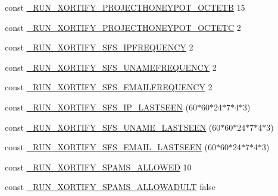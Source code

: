 \begin{DoxyCompactItemize}
\item 
const \hyperlink{config_8php_aa52fc59b0aa945d92da63d4095a6ef4c}{\-\_\-\-R\-U\-N\-\_\-\-X\-O\-R\-T\-I\-F\-Y\-\_\-\-P\-R\-O\-J\-E\-C\-T\-H\-O\-N\-E\-Y\-P\-O\-T\-\_\-\-O\-C\-T\-E\-T\-B} 15
\item 
const \hyperlink{config_8php_aef0ff869d4917b07eeef78e3907051fb}{\-\_\-\-R\-U\-N\-\_\-\-X\-O\-R\-T\-I\-F\-Y\-\_\-\-P\-R\-O\-J\-E\-C\-T\-H\-O\-N\-E\-Y\-P\-O\-T\-\_\-\-O\-C\-T\-E\-T\-C} 2
\item 
const \hyperlink{config_8php_aa1de68f879c9e10c9b2ba56242e0d4ad}{\-\_\-\-R\-U\-N\-\_\-\-X\-O\-R\-T\-I\-F\-Y\-\_\-\-S\-F\-S\-\_\-\-I\-P\-F\-R\-E\-Q\-U\-E\-N\-C\-Y} 2
\item 
const \hyperlink{config_8php_a5fa0c103131b6fb71c3aee12b5f3988f}{\-\_\-\-R\-U\-N\-\_\-\-X\-O\-R\-T\-I\-F\-Y\-\_\-\-S\-F\-S\-\_\-\-U\-N\-A\-M\-E\-F\-R\-E\-Q\-U\-E\-N\-C\-Y} 2
\item 
const \hyperlink{config_8php_a86721cfe66327022ce31e9dda14dec34}{\-\_\-\-R\-U\-N\-\_\-\-X\-O\-R\-T\-I\-F\-Y\-\_\-\-S\-F\-S\-\_\-\-E\-M\-A\-I\-L\-F\-R\-E\-Q\-U\-E\-N\-C\-Y} 2
\item 
const \hyperlink{config_8php_a2d4395744043511aa2373782449c27ef}{\-\_\-\-R\-U\-N\-\_\-\-X\-O\-R\-T\-I\-F\-Y\-\_\-\-S\-F\-S\-\_\-\-I\-P\-\_\-\-L\-A\-S\-T\-S\-E\-E\-N} (60$\ast$60$\ast$24$\ast$7$\ast$4$\ast$3)
\item 
const \hyperlink{config_8php_ad8d0704b704d065c6c9b2675be92cf90}{\-\_\-\-R\-U\-N\-\_\-\-X\-O\-R\-T\-I\-F\-Y\-\_\-\-S\-F\-S\-\_\-\-U\-N\-A\-M\-E\-\_\-\-L\-A\-S\-T\-S\-E\-E\-N} (60$\ast$60$\ast$24$\ast$7$\ast$4$\ast$3)
\item 
const \hyperlink{config_8php_aead2c54623816fd9677567479b67672c}{\-\_\-\-R\-U\-N\-\_\-\-X\-O\-R\-T\-I\-F\-Y\-\_\-\-S\-F\-S\-\_\-\-E\-M\-A\-I\-L\-\_\-\-L\-A\-S\-T\-S\-E\-E\-N} (60$\ast$60$\ast$24$\ast$7$\ast$4$\ast$3)
\item 
const \hyperlink{config_8php_aee7f22803e6d13110ef8251d0e5c83ca}{\-\_\-\-R\-U\-N\-\_\-\-X\-O\-R\-T\-I\-F\-Y\-\_\-\-S\-P\-A\-M\-S\-\_\-\-A\-L\-L\-O\-W\-E\-D} 10
\item 
const \hyperlink{config_8php_a6ba8b694951ab39e9ddeed7ef2d40ab8}{\-\_\-\-R\-U\-N\-\_\-\-X\-O\-R\-T\-I\-F\-Y\-\_\-\-S\-P\-A\-M\-S\-\_\-\-A\-L\-L\-O\-W\-A\-D\-U\-L\-T} false
\end{DoxyCompactItemize}


